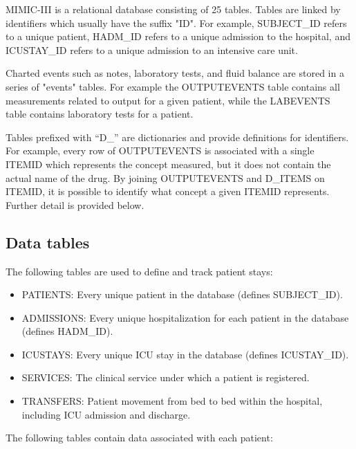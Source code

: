 \documentclass[english]{article}
\begin{document}

MIMIC-III is a relational database consisting of 25 tables. Tables are linked by identifiers which usually have the suffix "ID". For example, SUBJECT\_ID refers to a unique patient, HADM\_ID refers to a unique admission to the hospital, and ICUSTAY\_ID refers to a unique admission to an intensive care unit. 

Charted events such as notes, laboratory tests, and fluid balance are stored in a series of "events" tables. For example the OUTPUTEVENTS table contains all measurements related to output for a given patient, while the LABEVENTS table contains laboratory tests for a patient.

Tables prefixed with “D\_” are dictionaries and provide definitions for identifiers. For example, every row of OUTPUTEVENTS is associated with a single ITEMID which represents the concept measured, but it does not contain the actual name of the drug. By joining OUTPUTEVENTS and D\_ITEMS on ITEMID, it is possible to identify what concept a given ITEMID represents. Further detail is provided below.

\subsection*{Data tables}

The following tables are used to define and track patient stays:

\begin{itemize}
  \item PATIENTS: Every unique patient in the database (defines SUBJECT\_ID).
  \item ADMISSIONS: Every unique hospitalization for each patient in the database (defines HADM\_ID).
  \item ICUSTAYS: Every unique ICU stay in the database (defines ICUSTAY\_ID).
  \item SERVICES: The clinical service under which a patient is registered.
  \item TRANSFERS: Patient movement from bed to bed within the hospital, including ICU admission and discharge.
\end{itemize}

The following tables contain data associated with each patient:
\end{document}
